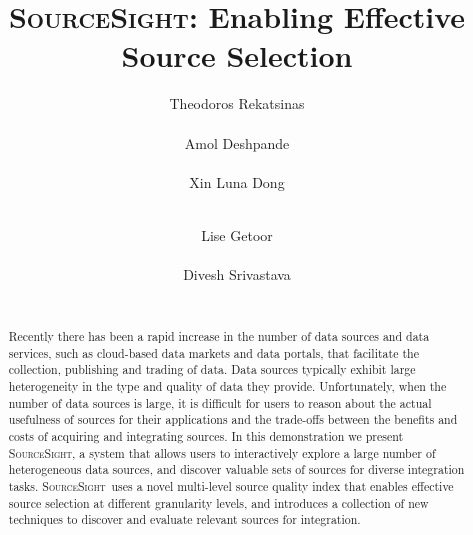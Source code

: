 \documentclass{sig-alternate-05-2015}
\newcommand\system{\textsc{SourceSight}}
\begin{document}
 

\title{{\LARGE \system}: Enabling Effective Source Selection}


\author{
\alignauthor
Theodoros Rekatsinas\\
       \\
\alignauthor
Amol Deshpande\\
       \\
\alignauthor 
Xin Luna Dong\\
       \\
\and  %
\alignauthor 
Lise Getoor\\
       \\
\alignauthor Divesh Srivastava\\
       \\
}

\maketitle

\begin{abstract}
Recently there has been a rapid increase in the number of data sources and data services, such as cloud-based data markets and data portals, that facilitate the collection, publishing and trading of data. Data sources typically exhibit large heterogeneity in the type and quality of data they provide. Unfortunately, when the number of data sources is large, it is difficult for users to reason about the actual usefulness of sources for their applications and the trade-offs between the benefits and costs of acquiring and integrating sources. In this demonstration we present \system, a system that allows users to interactively explore a large number of heterogeneous data sources, and discover valuable sets of sources for diverse integration tasks. \system~uses a novel multi-level source quality index that enables effective source selection at different granularity levels, and introduces a collection of new techniques to discover and evaluate relevant sources for integration.
\end{abstract}
\end{document}
